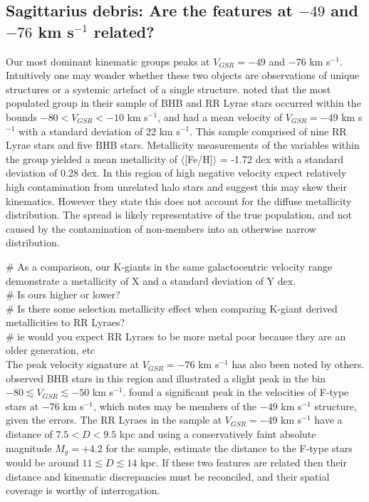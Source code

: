 \documentclass{emulateapj}
\begin{document}
	
\subsection{Sagittarius debris: Are the features at $-49$ and $-76$ km s$^{-1}$ related?}
\label{sec:sgr-peak-analysis}
			
	Our most dominant kinematic groups peaks at $V_{GSR} = - 49$ and $-76$ km s$^{-1}$. Intuitively one may wonder whether these two objects are observations of unique structures or a systemic artefact of a single structure. \citet{Vivas;et-al_2008} noted that the most populated group in their sample of BHB and RR Lyrae stars occurred within the bounds $-80 < V_{GSR} < -10$ km s$^{-1}$, and had a mean velocity of $V_{GSR} = -49$ km s$^{-1}$ with a standard deviation of 22 km s$^{-1}$. This sample comprised of nine RR Lyrae stars and five BHB stars. Metallicity measurements of the variables within the group yielded a mean metallicity of $\langle$[Fe/H]$\rangle$ = -1.72 dex with a standard deviation of 0.28 dex. In this region of high negative velocity\citet{Vivas;et-al_2008} expect relatively high contamination from unrelated halo stars and suggest this may skew their kinematics. However they state this does not account for the diffuse metallicity distribution. The spread is likely representative of the true population, and not caused by the contamination of non-members into an otherwise narrow distribution. 
	
\# As a comparison, our K-giants in the same galactocentric velocity range demonstrate a metallicity of X and a standard deviation of Y dex. \\
\# Is ours higher or lower? \\
\# Is there some selection metallicity effect when comparing K-giant derived metallicities to RR Lyraes? \\
\# ie would you expect RR Lyraes to be more metal poor because they are an older generation, etc \\
			
			
	The peak velocity signature at $V_{GSR} = -76$ km s$^{-1}$ has also been noted by others. \citet{Duffau;et-al_2006} observed BHB stars in this region and illustrated a slight peak in the bin $-80 \lesssim V_{GSR} \lesssim -50$ km s$^{-1}$. \citet{Newberg;et-al_2007} found a significant peak in the velocities of F-type stars at $-76$ km s$^{-1}$, which \citet{Vivas;et-al_2008} notes may be members of the $-49$ km s$^{-1}$ structure, given the errors. The RR Lyraes in the \citet{Vivas;et-al_2008} sample at $V_{GSR} = -49$ km s$^{-1}$ have a distance of $7.5 < D < 9.5$ kpc and using a conservatively faint absolute magnitude $M_g = +4.2$ for the \citet{Newberg;et-al_2007} sample, \citet{Vivas;et-al_2008} estimate the distance to the F-type stars would be around $11 \lesssim D \lesssim 14$ kpc. If these two features are related then their distance and kinematic discrepancies must be reconciled, and their spatial coverage is worthy of interrogation.
\end{document}
